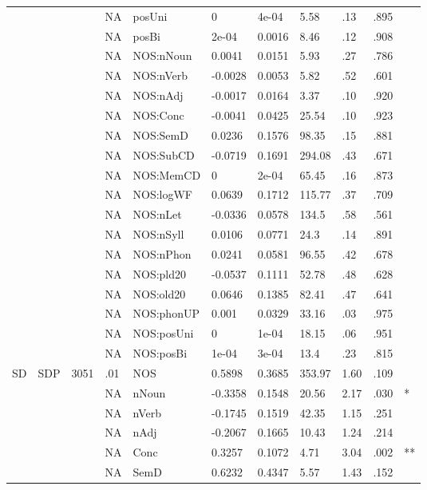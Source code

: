 \begin{table}[ht]
\begin{tabular}{lllllllllll}
   &  &  & NA & posUni & 0 & 4e-04 & 5.58 & .13 & .895 &   \\ 
   &  &  & NA & posBi & 2e-04 & 0.0016 & 8.46 & .12 & .908 &   \\ 
   &  &  & NA & NOS:nNoun & 0.0041 & 0.0151 & 5.93 & .27 & .786 &   \\ 
   &  &  & NA & NOS:nVerb & -0.0028 & 0.0053 & 5.82 & .52 & .601 &   \\ 
   &  &  & NA & NOS:nAdj & -0.0017 & 0.0164 & 3.37 & .10 & .920 &   \\ 
   &  &  & NA & NOS:Conc & -0.0041 & 0.0425 & 25.54 & .10 & .923 &   \\ 
   &  &  & NA & NOS:SemD & 0.0236 & 0.1576 & 98.35 & .15 & .881 &   \\ 
   &  &  & NA & NOS:SubCD & -0.0719 & 0.1691 & 294.08 & .43 & .671 &   \\ 
   &  &  & NA & NOS:MemCD & 0 & 2e-04 & 65.45 & .16 & .873 &   \\ 
   &  &  & NA & NOS:logWF & 0.0639 & 0.1712 & 115.77 & .37 & .709 &   \\ 
   &  &  & NA & NOS:nLet & -0.0336 & 0.0578 & 134.5 & .58 & .561 &   \\ 
   &  &  & NA & NOS:nSyll & 0.0106 & 0.0771 & 24.3 & .14 & .891 &   \\ 
   &  &  & NA & NOS:nPhon & 0.0241 & 0.0581 & 96.55 & .42 & .678 &   \\ 
   &  &  & NA & NOS:pld20 & -0.0537 & 0.1111 & 52.78 & .48 & .628 &   \\ 
   &  &  & NA & NOS:old20 & 0.0646 & 0.1385 & 82.41 & .47 & .641 &   \\ 
   &  &  & NA & NOS:phonUP & 0.001 & 0.0329 & 33.16 & .03 & .975 &   \\ 
   &  &  & NA & NOS:posUni & 0 & 1e-04 & 18.15 & .06 & .951 &   \\ 
   &  &  & NA & NOS:posBi & 1e-04 & 3e-04 & 13.4 & .23 & .815 &   \\ 
  SD & SDP & 3051 & .01 & NOS & 0.5898 & 0.3685 & 353.97 & 1.60 & .109 &   \\ 
   &  &  & NA & nNoun & -0.3358 & 0.1548 & 20.56 & 2.17 & .030 & * \\ 
   &  &  & NA & nVerb & -0.1745 & 0.1519 & 42.35 & 1.15 & .251 &   \\ 
   &  &  & NA & nAdj & -0.2067 & 0.1665 & 10.43 & 1.24 & .214 &   \\ 
   &  &  & NA & Conc & 0.3257 & 0.1072 & 4.71 & 3.04 & .002 & ** \\ 
   &  &  & NA & SemD & 0.6232 & 0.4347 & 5.57 & 1.43 & .152 &   \\ 

\end{tabular}
\end{table}
